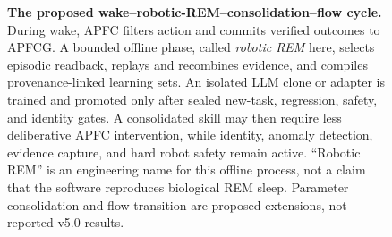 \begin{figure}[!t]
\centering
\resizebox{\textwidth}{!}{}
\caption{\textbf{The proposed wake--robotic-REM--consolidation--flow cycle.}
During wake, APFC filters action and commits verified outcomes to APFCG.  A
bounded offline phase, called \emph{robotic REM} here, selects episodic
readback, replays and recombines evidence, and compiles provenance-linked
learning sets.  An isolated LLM clone or adapter is trained and promoted only
after sealed new-task, regression, safety, and identity gates.  A consolidated
skill may then require less deliberative APFC intervention, while identity,
anomaly detection, evidence capture, and hard robot safety remain active.
``Robotic REM'' is an engineering name for this offline process, not a claim
that the software reproduces biological REM sleep.  Parameter consolidation
and flow transition are proposed extensions, not reported v5.0 results.}
\label{fig:consolidation-pipeline}
\end{figure}
